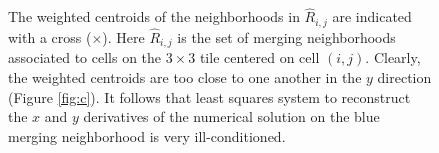 \begin{figure}
    \centering
     \hfill
     \hfill
    \caption{\sf 
    The weighted centroids of the neighborhoods in $\widehat{R}_{i,j}$ are indicated with a cross ($\times$).  
    Here $\widehat{R}_{i,j}$ is the set of merging neighborhoods associated to cells on the $3\times3$ tile centered on cell $(i,j)$.
    Clearly, the weighted centroids are too close to one another in the $y$ direction (Figure \ref{fig:c}).  It follows that least squares system to reconstruct the $x$ and $y$ derivatives of the numerical solution on the blue merging neighborhood is very ill-conditioned.
}
    \label{fig:tooclose}
\end{figure}

